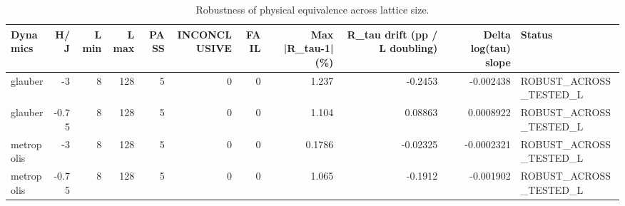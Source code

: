 \begin{table}
\caption{Robustness of physical equivalence across lattice size.}
\label{tab:size_robustness}
\begin{tabular}{lrrrrrrrrrl}
\toprule
Dynamics & H/J & L min & L max & PASS & INCONCLUSIVE & FAIL & Max |R\_tau-1| (\%) & R\_tau drift (pp / L doubling) & Delta log(tau) slope & Status \\
\midrule
glauber & -3 & 8 & 128 & 5 & 0 & 0 & 1.237 & -0.2453 & -0.002438 & ROBUST\_ACROSS\_TESTED\_L \\
glauber & -0.75 & 8 & 128 & 5 & 0 & 0 & 1.104 & 0.08863 & 0.0008922 & ROBUST\_ACROSS\_TESTED\_L \\
metropolis & -3 & 8 & 128 & 5 & 0 & 0 & 0.1786 & -0.02325 & -0.0002321 & ROBUST\_ACROSS\_TESTED\_L \\
metropolis & -0.75 & 8 & 128 & 5 & 0 & 0 & 1.065 & -0.1912 & -0.001902 & ROBUST\_ACROSS\_TESTED\_L \\
\bottomrule
\end{tabular}
\end{table}

